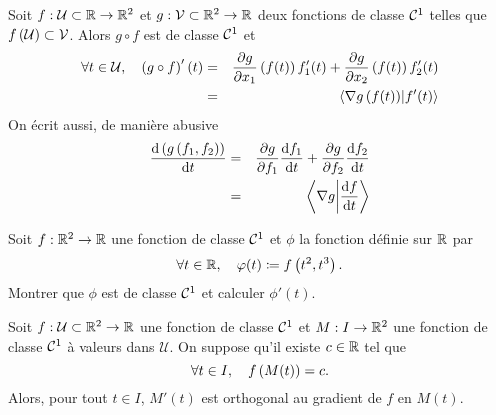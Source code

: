 \documentclass{magnolia}
\begin{document}


\begin{proposition}
Soit $f:\mathcal{U}\subset\mathbb{R}\to\mathbb{R}^2$ et $g:\mathcal{V}\subset\mathbb{R}^2\to\mathbb{R}$ deux
fonctions de classe $\mathcal{C}^{1}$ telles que
$f\left(\mathcal{U}\right)\subset\mathcal{V}$. Alors $g\circ f$ est de classe
$\mathcal{C}^{1}$ et
\begin{eqnarray*}
\forall t\in\mathcal{U} ,\quad \left(g\circ f\right)'(t)
&=&\frac{\partial g}{\partial x_1}\left(f(t)\right)f_1'(t)+\frac{\partial g}{\partial x_2}\left(f(t)\right)f_2'(t)\\
&=&\left\langle {\nabla g \left(f(t)\right)}\middle|{f'(t)}\right\rangle
\end{eqnarray*}
On écrit aussi, de manière abusive
\begin{eqnarray*}
\frac{{\rm d}\left(g\left(f_1,f_2\right)\right)}{{\rm d} t}
&=& \frac{\partial g}{\partial f_1}\frac{{\rm d}f_1}{{\rm d} t}+
    \frac{\partial g}{\partial f_2}\frac{{\rm d}f_2}{{\rm d} t}\\
&=& \left\langle {\nabla g}\middle|{\frac{{\rm d}f}{{\rm d}t}}\right\rangle
\end{eqnarray*}
\end{proposition}

\begin{exoUnique}
\exo Soit $f:\mathbb{R}^2\to\mathbb{R}$ une fonction de classe $\mathcal{C}^{1}$ et
  $\phi$ la fonction définie sur $\mathbb{R}$ par
  \[\forall t\in\mathbb{R} ,\quad \varphi(t)\coloneqq f\left(t^2,t^3\right).\]
  Montrer que $\phi$ est de classe $\mathcal{C}^{1}$ et calculer $\phi'(t)$.
\end{exoUnique}

\begin{proposition}
Soit $f:\mathcal{U}\subset\mathbb{R}^2\to\mathbb{R}$ une fonction de classe $\mathcal{C}^{1}$ et
$M:I\to\mathbb{R}^2$ une fonction de classe $\mathcal{C}^{1}$ à valeurs dans 
$\mathcal{U}$. On suppose qu'il existe $c\in\mathbb{R}$ tel que
\[\forall t\in I ,\quad f\left(M(t)\right)=c.\]
Alors, pour tout $t\in I$, $M'(t)$ est orthogonal au gradient
de $f$ en $M(t)$.
\end{proposition}
\end{document}
